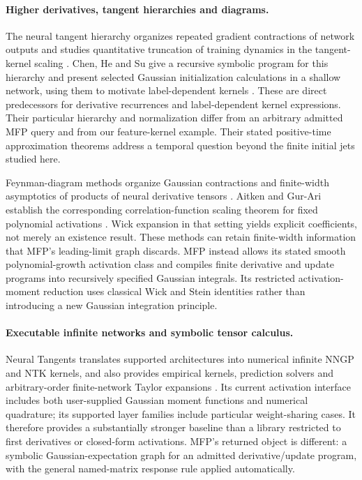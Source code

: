 \paragraph{Higher derivatives, tangent hierarchies and diagrams.}
The neural tangent hierarchy organizes repeated gradient contractions of
network outputs and studies quantitative truncation of training dynamics
in the tangent-kernel scaling \cite{huang2020nth}. Chen, He and
Su give a recursive symbolic program for this hierarchy and present
selected Gaussian initialization calculations in a shallow network,
using them to motivate label-dependent kernels \cite{chen2020lantk}.
These are direct predecessors for derivative recurrences and
label-dependent kernel expressions. Their particular hierarchy and
normalization differ from an arbitrary admitted MFP query and from our
feature-kernel example. Their stated positive-time approximation theorems
address a temporal question beyond the finite initial jets studied here.

Feynman-diagram methods organize Gaussian contractions and finite-width
asymptotics of products of neural derivative tensors
\cite{dyer2019feynman}. Aitken and Gur-Ari establish the corresponding
correlation-function scaling theorem for fixed polynomial activations
\cite{aitken2020nonlinear}. Wick expansion in that setting yields explicit
coefficients, not merely an existence result. These methods can retain
finite-width information that MFP's leading-limit graph discards. MFP
instead allows its stated smooth polynomial-growth activation class and
compiles finite derivative and update programs into recursively specified
Gaussian integrals. Its restricted activation-moment reduction uses
classical Wick and Stein identities rather than introducing a new
Gaussian integration principle.

\paragraph{Executable infinite networks and symbolic tensor calculus.}
Neural Tangents translates supported architectures into numerical infinite
NNGP and NTK kernels, and also provides empirical kernels, prediction
solvers and arbitrary-order finite-network Taylor expansions
\cite{novak2020neuraltangents}. Its current activation interface includes
both user-supplied Gaussian moment functions and numerical quadrature;
its supported layer families include particular weight-sharing cases.
It therefore provides a substantially stronger baseline than a library
restricted to first derivatives or closed-form activations. MFP's returned
object is different: a symbolic Gaussian-expectation graph for an admitted
derivative/update program, with the general named-matrix response rule
applied automatically.

